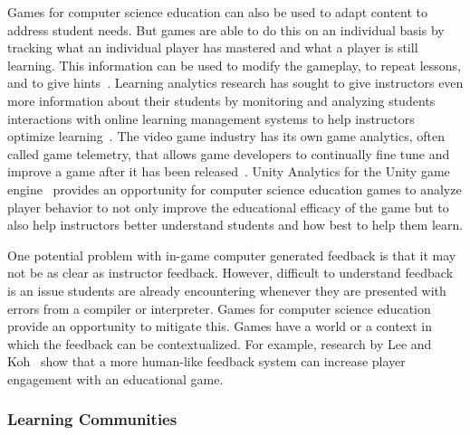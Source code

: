 \documentclass{sig-alternate-05-2015}
\begin{document}
Games for computer science education can also be used to adapt content to address student needs. But games are able to do this on an individual basis by tracking what an individual player has mastered and what a player is still learning. This information can be used to modify the gameplay, to repeat lessons, and to give hints~\cite{kiili2005digital,hicks2014building}. Learning analytics research has sought to give instructors even more information about their students by monitoring and analyzing students interactions with online learning management systems to help instructors optimize learning~\cite{romero2007educational}. The video game industry has its own game analytics, often called game telemetry, that allows game developers to continually fine tune and improve a game after it has been released~\cite{loh2012information}. Unity Analytics for the Unity game engine~\cite{unity3d} provides an opportunity for computer science education games to analyze player behavior to not only improve the educational efficacy of the game but to also help instructors better understand students and how best to help them learn.



One potential problem with in-game computer generated feedback is that it may not be as clear as instructor feedback. However, difficult to understand feedback is an issue students are already encountering whenever they are presented with errors from a compiler or interpreter. Games for computer science education provide an opportunity to mitigate this. Games have a world or a context in which the feedback can be contextualized. For example, research by Lee and Koh~\cite{lee2012investigating} show that a more human-like feedback system can increase player engagement with an educational game.\subsubsection{Learning Communities}
\end{document}
